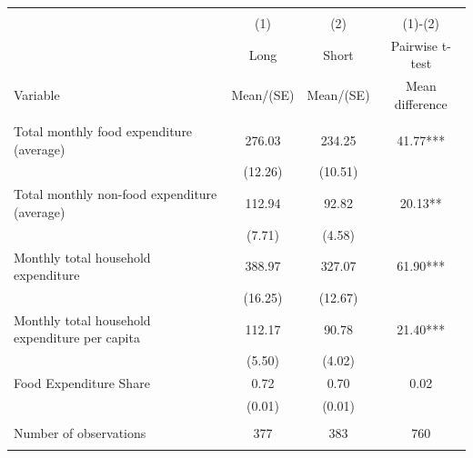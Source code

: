 
\begin{tabular}{@{\extracolsep{5pt}}lccc}
\\[-1.8ex]\hline \hline \\[-1.8ex]
 & \multicolumn{1}{c}{(1)}  & \multicolumn{1}{c}{(2)}  & \multicolumn{1}{c}{(1)-(2)} \\
 & \multicolumn{1}{c}{Long}  & \multicolumn{1}{c}{Short}  & \multicolumn{1}{c}{Pairwise t-test}  \\
Variable & Mean/(SE) & Mean/(SE) & Mean difference \\ \hline \\[-1.8ex] 
Total monthly food expenditure (average)   & 276.03    & 234.25    & 41.77***   \\
 & (12.26)  & (10.51)  &  \\ [1ex]
Total monthly non-food expenditure (average)   & 112.94    & 92.82    & 20.13**   \\
 & (7.71)  & (4.58)  &  \\ [1ex]
Monthly total household expenditure   & 388.97    & 327.07    & 61.90***   \\
 & (16.25)  & (12.67)  &  \\ [1ex]
Monthly total household expenditure per capita   & 112.17    & 90.78    & 21.40***   \\
 & (5.50)  & (4.02)  &  \\ [1ex]
Food Expenditure Share   & 0.72    & 0.70    & 0.02   \\
 & (0.01)  & (0.01)  &  \\ [1ex]
\hline \\[-1.8ex]
Number of observations  & 377   & 383  & 760  \\
\hline \hline \\[-1.8ex]

\end{tabular}
